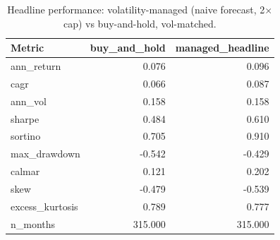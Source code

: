 \begin{table}[htbp]
\centering
\caption{Headline performance: volatility-managed (naive forecast, 2$\times$ cap) vs buy-and-hold, vol-matched.}
\label{tab:metrics}
\small
\begin{tabular}{lrr}
\toprule
Metric & buy\_and\_hold & managed\_headline \\
\midrule
ann\_return & 0.076 & 0.096 \\
cagr & 0.066 & 0.087 \\
ann\_vol & 0.158 & 0.158 \\
sharpe & 0.484 & 0.610 \\
sortino & 0.705 & 0.910 \\
max\_drawdown & -0.542 & -0.429 \\
calmar & 0.121 & 0.202 \\
skew & -0.479 & -0.539 \\
excess\_kurtosis & 0.789 & 0.777 \\
n\_months & 315.000 & 315.000 \\
\bottomrule
\end{tabular}
\end{table}

